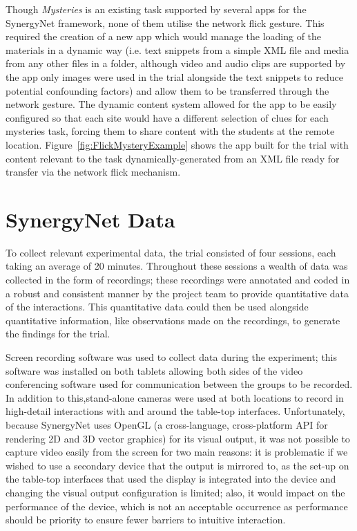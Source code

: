 \documentclass[a4paper,11pt]{article}
\begin{document}
Though {\emph{Mysteries}} is an existing task supported by several apps for the SynergyNet framework, none of them utilise the network flick gesture.
This required the creation of a new app which would manage the loading of the materials in a dynamic way (i.e. text snippets from a simple XML file and media from any other files in a folder, although video and audio clips are supported by the app only images were used in the trial alongside the text snippets to reduce potential confounding factors) and allow them to be transferred through the network gesture.
The dynamic content system allowed for the app to be easily configured so that each site would have a different selection of clues for each mysteries task, forcing them to share content with the students at the remote location.
Figure~\ref{fig:FlickMysteryExample} shows the app built for the trial with content relevant to the task dynamically-generated from an XML file ready for transfer via the network flick mechanism.


\section{SynergyNet Data} 

To collect relevant experimental data, the trial consisted of four sessions, each taking an average of 20 minutes.
Throughout these sessions a wealth of data was collected in the form of recordings; these recordings were annotated and coded in a robust and consistent manner by the project team to provide quantitative data of the interactions.
This quantitative data could then be used alongside quantitative information, like observations made on the recordings, to generate the findings for the trial.
 

Screen recording software was used to collect data during the experiment; this software was installed on both tablets allowing both sides of the video conferencing software used for communication between the groups to be recorded.
In addition to this,stand-alone cameras were used at both locations to record in high-detail interactions with and around the table-top interfaces.
Unfortunately, because SynergyNet uses OpenGL (a cross-language, cross-platform API for rendering 2D and 3D vector graphics) for its visual output, it was not possible to capture video easily from the screen for two main reasons: it is problematic if we wished to use a secondary device that the output is mirrored to, as the set-up on the table-top interfaces that used the display is integrated into the device and changing the visual output configuration is limited; also, it would impact on the performance of the device, which is not an acceptable occurrence as performance should be priority to ensure fewer barriers to intuitive interaction.
\end{document}
